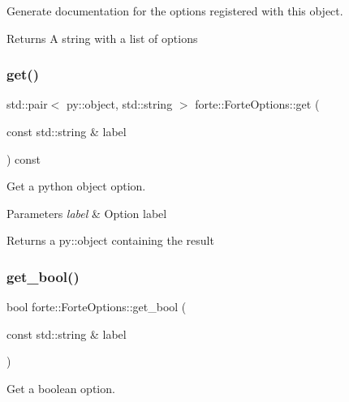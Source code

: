 Generate documentation for the options registered with this object. 

\begin{DoxyReturn}{Returns}
A string with a list of options 
\end{DoxyReturn}
\mbox{\label{classforte_1_1_forte_options_a4c5964f66003ea681399fd60256443a0}} 
\subsubsection{\texorpdfstring{get()}{get()}}
{\footnotesize\ttfamily std\+::pair$<$ py\+::object, std\+::string $>$ forte\+::\+Forte\+Options\+::get (\begin{DoxyParamCaption}\item[{const std\+::string \&}]{label }\end{DoxyParamCaption}) const}



Get a python object option. 


\begin{DoxyParams}{Parameters}
{\em label} & Option label \\
\hline
\end{DoxyParams}
\begin{DoxyReturn}{Returns}
a py\+::object containing the result 
\end{DoxyReturn}
\mbox{\label{classforte_1_1_forte_options_a0cc337e09077f5abad7170342aafbae0}} 
\subsubsection{\texorpdfstring{get\+\_\+bool()}{get\_bool()}}
{\footnotesize\ttfamily bool forte\+::\+Forte\+Options\+::get\+\_\+bool (\begin{DoxyParamCaption}\item[{const std\+::string \&}]{label }\end{DoxyParamCaption})}



Get a boolean option. 


